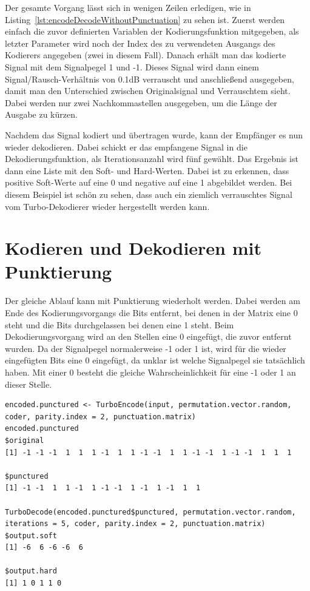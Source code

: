 Der gesamte Vorgang lässt sich in wenigen Zeilen erledigen, wie in Listing~\ref{lst:encodeDecodeWithoutPunctuation} zu sehen ist. Zuerst werden einfach die zuvor definierten Variablen der Kodierungsfunktion mitgegeben, als letzter Parameter wird noch der Index des zu verwendeten Ausgangs des Kodierers angegeben (zwei in diesem Fall). Danach erhält man das kodierte Signal mit dem Signalpegel 1 und -1. Dieses Signal wird dann einem Signal/Rausch-Verhältnis von 0.1dB  verrauscht und anschließend ausgegeben, damit man den Unterschied zwischen Originalsignal und Verrauschtem sieht. Dabei werden nur zwei Nachkommastellen ausgegeben, um die Länge der Ausgabe zu kürzen. 

Nachdem das Signal kodiert und übertragen wurde, kann der Empfänger es nun wieder dekodieren. Dabei schickt er das empfangene Signal in die Dekodierungsfunktion, als Iterationsanzahl wird fünf gewählt. Das Ergebnis ist dann eine Liste mit den Soft- und Hard-Werten. Dabei ist zu erkennen, dass positive Soft-Werte auf eine 0 und negative auf eine 1 abgebildet werden. Bei diesem Beispiel ist schön zu sehen, dass auch ein ziemlich verrauschtes Signal vom Turbo-Dekodierer wieder hergestellt werden kann.

\FloatBarrier
\section{Kodieren und Dekodieren mit Punktierung}
\label{sec:example_withPunctuation}

Der gleiche Ablauf kann mit Punktierung wiederholt werden. Dabei werden am Ende des Kodierungsvorgangs die Bits entfernt, bei denen in der Matrix eine 0 steht und die Bits durchgelassen bei denen eine 1 steht. Beim Dekodierungsvorgang wird an den Stellen eine 0 eingefügt, die zuvor entfernt wurden. Da der Signalpegel normalerweise -1 oder 1 ist, wird für die wieder eingefügten Bits eine 0 eingefügt, da unklar ist welche Signalpegel sie tatsächlich haben. Mit einer 0 besteht die gleiche Wahrscheinlichkeit für eine -1 oder 1 an dieser Stelle.

\begin{lstlisting}[caption=Kodierung und Dekodierung mit Punktierung, label={lst:encodeDecodeWithPunctuation}, float=!th]
encoded.punctured <- TurboEncode(input, permutation.vector.random, coder, parity.index = 2, punctuation.matrix)
encoded.punctured
$original
[1] -1 -1 -1  1  1  1 -1  1  1 -1 -1  1  1 -1 -1  1 -1 -1  1  1  1

$punctured
[1] -1 -1  1  1 -1  1 -1 -1  1 -1  1 -1  1  1

TurboDecode(encoded.punctured$punctured, permutation.vector.random, iterations = 5, coder, parity.index = 2, punctuation.matrix)
$output.soft
[1] -6  6 -6 -6  6

$output.hard
[1] 1 0 1 1 0
\end{lstlisting}

